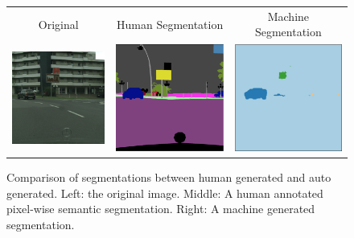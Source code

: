 \documentclass[10pt,twocolumn,letterpaper]{article}
\begin{document}
\begin{figure}[ht!]
\begin{center}
    \begin{tabular}{ccc}
        Original & Human Segmentation & Machine Segmentation \\
    \includegraphics[trim=0 0 0 0, clip,
        width=2.0in]{images/segmentation_original.png} &
    \includegraphics[trim=0 0 0 0, clip,
        width=2.0in]{images/segmentation_human.png} &
    \includegraphics[trim=0 0 0 0, clip,
        width=2.0in]{images/segmentation_machine.png} \\
    \end{tabular}
    
\end{center}
  		\caption{Comparison of segmentations between human generated and auto generated. Left: the original image. Middle: A human annotated pixel-wise semantic segmentation. Right: A machine generated segmentation.} 
	\label{fig:generator}
\end{figure}
\end{document}
